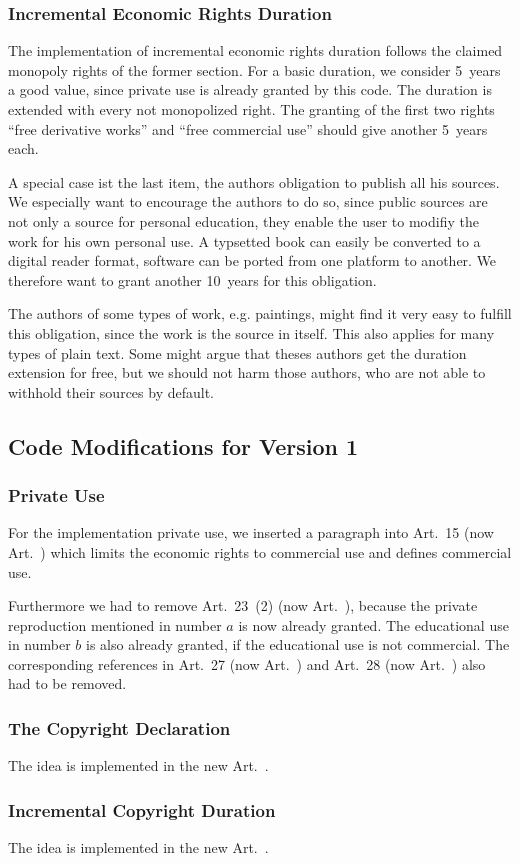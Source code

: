 \subsubsection{Incremental Economic Rights Duration}

The implementation of incremental economic rights duration follows the claimed monopoly rights of the former section. For a basic duration, we consider 5~years a good value, since private use is already granted by this code. The duration is extended with every not monopolized right. The granting of the first two rights ``free derivative works'' and ``free commercial use'' should give another 5~years each.

A special case ist the last item, the authors obligation to publish all his sources. We especially want to encourage the authors to do so, since public sources are not only a source for personal education, they enable the user to modifiy the work for his own personal use. A typsetted book can easily be converted to a digital reader format, software can be ported from one platform to another. We therefore want to grant another 10~years for this obligation.

The authors of some types of work, e.g. paintings, might find it very easy to fulfill this obligation, since the work is the source in itself. This also applies for many types of plain text. Some might argue that theses authors get the duration extension for free, but we should not harm those authors, who are not able to withhold their sources by default.

\subsection{Code Modifications for Version 1}

\subsubsection{Private Use}

For the implementation private use, we inserted a paragraph into Art.~15 (now Art.~) which limits the economic rights to commercial use and defines commercial use.

Furthermore we had to remove Art.~23~(2) (now Art.~), because the private reproduction mentioned in number $a$ is now already granted. The educational use in number $b$ is also already granted, if the educational use is not commercial. The corresponding references in Art.~27 (now Art.~) and Art.~28 (now Art.~) also had to be removed.

\subsubsection{The Copyright Declaration}

The idea is implemented in the new Art.~.

\subsubsection{Incremental Copyright Duration}

The idea is implemented in the new Art.~.

